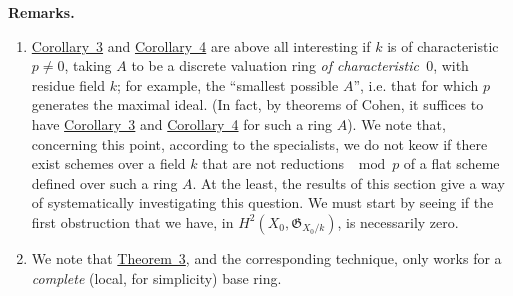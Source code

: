 \documentclass{article}
\newenvironment{rmenv}[1]
  {\phantomsection\par\medskip\noindent\textbf{#1.}\rmfamily}
  {\medskip}
\newcommand{\fk}{\mathfrak}
\newcommand{\oldpage}[1]{\marginpar{\footnotesize$\Big\vert$ \textit{p.~#1}}}
\begin{document}
\begin{rmenv}{Remarks}
  \begin{enumerate}[1)]
    \item \hyperref[theorem9corollary3]{Corollary~3} and \hyperref[theorem9corollary4]{Corollary~4} are above all interesting if $k$ is of characteristic~$p\neq0$, taking $A$ to be a discrete valuation ring \emph{of characteristic~$0$}, with residue field $k$;
      for example, the ``smallest possible $A$'', i.e. that for which $p$ generates the maximal ideal.
      (In fact, by theorems of Cohen, it suffices to have \hyperref[theorem9corollary3]{Corollary~3} and \hyperref[theorem9corollary4]{Corollary~4} for such a ring $A$).
      We note that, concerning this point, according to the specialists, we do not keow if there exist schemes over a field $k$ that are not reductions $\mod p$ of a flat scheme defined over such a ring $A$.
      At the least, the results of this section give a way of systematically investigating this question.
      We must start
\oldpage{182-15}
      by seeing if the first obstruction that we have, in $H^2(X_0,\fk{G}_{X_0/k})$, is necessarily zero.
    \item We note that \hyperref[theorem3]{Theorem~3}, and the corresponding technique, only works for a \emph{complete} (local, for simplicity) base ring.


\end{enumerate}
\end{rmenv}
\end{document}
